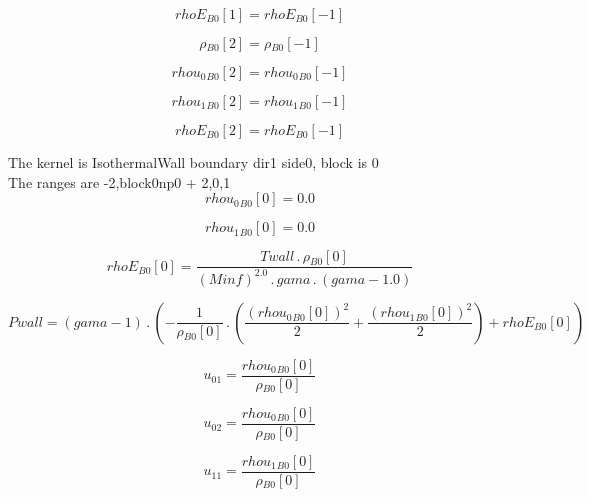\documentclass{article}
\begin{document}
\begin{dmath}{rhoE{_{B0}}}[{1}] = {rhoE{_{B0}}}[{-1}]\end{dmath}

\begin{dmath}{\rho{_{B0}}}[{2}] = {\rho{_{B0}}}[{-1}]\end{dmath}

\begin{dmath}{rhou_{0}{_{B0}}}[{2}] = {rhou_{0}{_{B0}}}[{-1}]\end{dmath}

\begin{dmath}{rhou_{1}{_{B0}}}[{2}] = {rhou_{1}{_{B0}}}[{-1}]\end{dmath}

\begin{dmath}{rhoE{_{B0}}}[{2}] = {rhoE{_{B0}}}[{-1}]\end{dmath}

\noindent The kernel is IsothermalWall boundary dir1 side0, block is 0\\\noindent The ranges are -2,block0np0 + 2,0,1\\\begin{dmath}{rhou_{0}{_{B0}}}[{0}] = 0.0\end{dmath}

\begin{dmath}{rhou_{1}{_{B0}}}[{0}] = 0.0\end{dmath}

\begin{dmath}{rhoE{_{B0}}}[{0}] = \frac{Twall \,.\, {\rho{_{B0}}}[{0}]}{\left(Minf \right)^{2.0} \,.\, gama \,.\, \left(gama - 1.0\right)}\end{dmath}

\begin{dmath}Pwall = \left(gama - 1\right) \,.\, \left(- \frac{1}{{\rho{_{B0}}}[{0}]} \,.\, \left(\frac{\left({rhou_{0}{_{B0}}}[{0}] \right)^{2}}{2} + \frac{\left({rhou_{1}{_{B0}}}[{0}] \right)^{2}}{2}\right) + {rhoE{_{B0}}}[{0}]\right)\end{dmath}

\begin{dmath}u_{01} = \frac{{rhou_{0}{_{B0}}}[{0}]}{{\rho{_{B0}}}[{0}]}\end{dmath}

\begin{dmath}u_{02} = \frac{{rhou_{0}{_{B0}}}[{0}]}{{\rho{_{B0}}}[{0}]}\end{dmath}

\begin{dmath}u_{11} = \frac{{rhou_{1}{_{B0}}}[{0}]}{{\rho{_{B0}}}[{0}]}\end{dmath}
\end{document}
